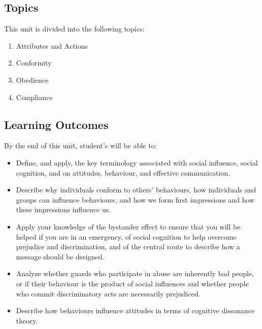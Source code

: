 \documentclass[
]{book}
\providecommand{\tightlist}{%
  \setlength{\itemsep}{0pt}\setlength{\parskip}{0pt}}
\begin{document}
\hypertarget{topics-5}{%
\subsection*{Topics}\label{topics-5}}

This unit is divided into the following topics:

\begin{enumerate}
\def\labelenumi{\arabic{enumi}.}
\tightlist
\item
  Attributes and Actions\\
\item
  Conformity\\
\item
  Obedience\\
\item
  Compliance
\end{enumerate}

\hypertarget{learning-outcomes-5}{%
\subsection*{Learning Outcomes}\label{learning-outcomes-5}}

By the end of this unit, student's will be able to:

\begin{itemize}
\tightlist
\item
  Define, and apply, the key terminology associated with social influence, social cognition, and on attitudes, behaviour, and effective communication.\\
\item
  Describe why individuals conform to others' behaviours, how individuals and groups can influence behaviours, and how we form first impressions and how these impressions influence us.\\
\item
  Apply your knowledge of the bystander effect to ensure that you will be helped if you are in an emergency, of social cognition to help overcome prejudice and discrimination, and of the central route to describe how a message should be designed.\\
\item
  Analyze whether guards who participate in abuse are inherently bad people, or if their behaviour is the product of social influences and whether people who commit discriminatory acts are necessarily prejudiced.\\
\item
  Describe how behaviours influence attitudes in terms of cognitive dissonance theory.
\end{itemize}
\end{document}
